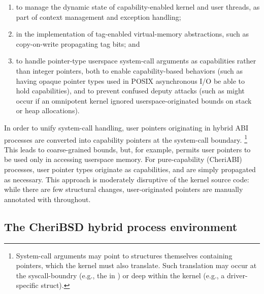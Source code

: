 \documentclass[12pt,twoside,openright,a4paper]{article}
\newcommand{\ccode}[1]{{\small\ttfamily{#1}}}
\newcommand{\uucap}{{\ccode{\_\_capability}}\xspace}
\newcommand{\note}[2]{{\color{blue}[ Note: #1 - #2]}}
\renewcommand{\note}[2]{\relax\ifhmode\unskip\fi}
\newcommand{\jhbnote}[1]{\note{#1}{John B.}}
\begin{document}
\begin{enumerate}
\item to manage the dynamic state of capability-enabled kernel and user
  threads, as part of context management and exception handling;

\item in the implementation of tag-enabled virtual-memory abstractions, such
  as copy-on-write propagating tag bits; and

\item to handle pointer-type userspace system-call arguments as capabilities
  rather than integer pointers, both to enable capability-based behaviors
  (such as having opaque pointer types used in POSIX asynchronous I/O be able
  to hold capabilities), and to prevent confused deputy attacks (such as might
  occur if an omnipotent kernel ignored userspace-originated bounds on stack
  or heap allocations).
  \jhbnote{I think system-call argument is perhaps too limiting.  We
    also use capabilities for things like the initial stack layout
    during exec which is fabricated by the kernel and not provided as
    a syscall argument.  I think it might be best to say something
    like ``userspace pointers'' most of which come from
    user-originated system call arguments, but may also be
    instantiated by the kernel.}
\end{enumerate}

In order to unify system-call handling, user pointers originating in hybrid
ABI processes are converted into capability pointers at the system-call
boundary.%
\footnote{System-call arguments may point to structures themselves containing
  pointers, which the kernel must also translate.
  Such translation may occur at the syscall-boundry (e.g., the \ccode{struct
  iovec} in \ccode{readv}) or deep within the kernel (e.g., a driver-specific
  \ccode{ioctl} struct).}
%
This leads to coarse-grained bounds, but, for example, permits user pointers to
be used only in accessing userspace memory.
For pure-capability (CheriABI) processes, user pointer types originate as
capabilities, and are simply propagated as necessary.
This approach is moderately disruptive of the kernel source code: while there
are few structural changes, user-originated pointers are manually annotated
with \uucap{} throughout.

\subsection{The CheriBSD hybrid process environment}
\end{document}
